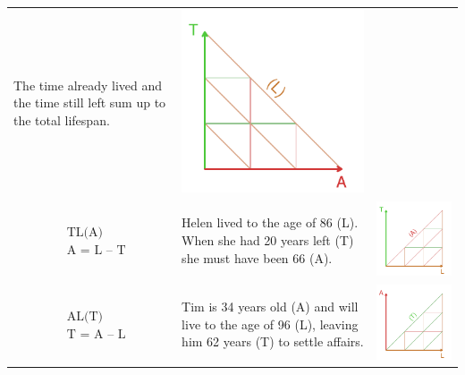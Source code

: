 \documentclass{bmcart}
\theoremstyle{definition}
\begin{document}
\begin{longtable}{m{}L{0.5\textwidth}C{0.2\textwidth}}
  The time already lived and the time still left sum up to the total lifespan. &
  \includegraphics[scale=.5]{Tab207.pdf}   
  \\
  $$\begin{aligned}
    &\text{TL(A)} \\
    &\text{A = L -- T}
  \end{aligned}$$ &
  Helen lived to the age of 86 (L). When she had 20 years left (T) she must have been 66 (A). &
  \includegraphics[scale=.5]{Tab208.pdf}   
 \\
  $$\begin{aligned}
    &\text{AL(T)} \\
    &\text{T = A -- L}
  \end{aligned}$$ &
  Tim is 34 years old (A) and will live to the age of 96 (L), leaving him 62 years (T) to settle affairs. &
  \includegraphics[scale=.5]{Tab209.pdf} 

\end{longtable}
\end{document}
